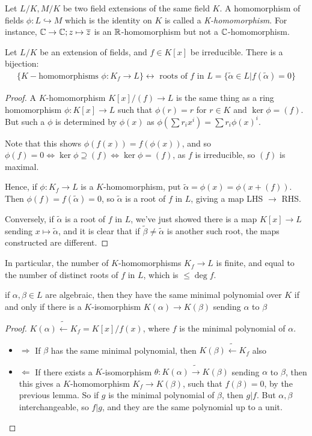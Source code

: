 \documentclass[a4paper, 10pt, twocolumn]{amsart}
\begin{document}
Let $L/K, M/K$ be two field extensions of the same field $K$. A homomorphism of fields $\phi:L\hookrightarrow M$ which is the identity on $K$ is called a \emph{K-homomorphism}. For instance, $\mathbb{C}\rightarrow \mathbb{C}; z\mapsto \overline{z}$ is an $\mathbb{R}$-homomorphism but not a $\mathbb{C}$-homomorphism.
\begin{lemma}
Let $L/K$ be an extension of fields, and $f\in K[x]$ be irreducible. There is a bijection:
\begin{align*}
\{K-\text{homomorphisms } \phi:K_f \rightarrow L\} \longleftrightarrow\text{ roots of $f$ in }L = \{\tilde{\alpha}\in L|f(\tilde{\alpha}) = 0 \}
\end{align*}
\end{lemma}
\begin{proof}
A $K$-homomorphism $K[x]/(f) \rightarrow L$ is the same thing as a ring homomorphism $\phi:K[x]\rightarrow L$ such that $\phi(r) = r$ for $r\in K$ and $\ker\phi = (f)$. But such a $\phi$ is determined by $\phi(x)$ as $\phi(\sum r_ix^i) = \sum r_i \phi(x)^i$.

Note that this shows $\phi(f(x)) = f(\phi(x))$, and so $\phi(f) = 0 \iff \ker \phi \supseteq (f) \iff \ker \phi = (f)$, as $f$ is irreducible, so $(f)$ is maximal.

Hence, if $\phi: K_f \rightarrow L$ is a $K$-homomorphism, put $\tilde{\alpha} = \phi(x) = \phi(x+(f))$. Then $\phi(f) = f(\tilde{\alpha}) = 0$, so $\tilde{\alpha}$ is a root of $f$ in $L$, giving a map LHS $\rightarrow$ RHS.

Conversely, if $\tilde{\alpha}$ is a root of $f$ in $L$, we've just showed there is a map $K[x]\rightarrow L$ sending $x\mapsto \tilde{\alpha}$, and it is clear that if $\tilde{\beta} \neq \tilde{\alpha}$ is another such root, the maps constructed are different.
\end{proof}
In particular, the number of $K$-homomorphisms $K_f\rightarrow L$ is finite, and equal to the number of distinct roots of $f$ in $L$, which is $\leq \deg f$.

\begin{corollary}
if $\alpha, \beta \in L$ are algebraic, then they have the same minimal polynomial over $K$ if and only if there is a $K$-isomorphism $K(\alpha) \rightarrow K(\beta)$ sending $\alpha$ to $\beta$
\end{corollary}
\begin{proof}
$K(\alpha)\tilde{\longleftarrow} K_f = K[x]/f(x)$, where $f$ is the minimal polynomial of $\alpha$.
\begin{itemize}
\item{$\Longrightarrow$} If $\beta$ has the same minimal polynomial, then $K(\beta) \tilde{\longleftarrow} K_f$ also

\item{$\Longleftarrow$} If there exists a $K$-isomorphism $\theta:K(\alpha) \tilde{\longrightarrow} K(\beta)$ sending $\alpha$ to $\beta$, then this gives a $K$-homomorphism $K_f \rightarrow K(\beta)$, such that $f(\beta) = 0$, by the previous lemma. So if $g$ is the minimal polynomial of $\beta$, then $g|f$. But $\alpha, \beta$ interchangeable, so $f|g$, and they are the same polynomial up to a unit.
\end{itemize}
\end{proof}
\end{document}
